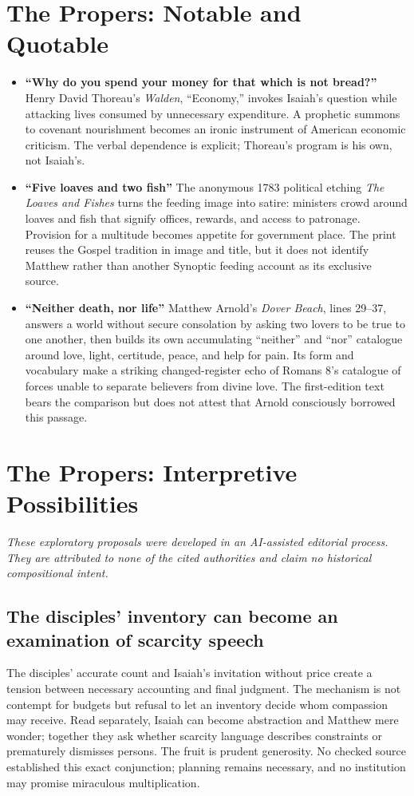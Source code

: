 \section*{The Propers: Notable and Quotable}
{\small
\begin{itemize}
\item \textbf{“Why do you spend your money for that which is not bread?”\enspace{}} Henry David Thoreau's \emph{Walden}, “Economy,” invokes Isaiah's question while attacking lives consumed by unnecessary expenditure. A prophetic summons to covenant nourishment becomes an ironic instrument of American economic criticism. The verbal dependence is explicit; Thoreau's program is his own, not Isaiah's.
\item \textbf{“Five loaves and two fish”\enspace{}} The anonymous 1783 political etching \emph{The Loaves and Fishes} turns the feeding image into satire: ministers crowd around loaves and fish that signify offices, rewards, and access to patronage. Provision for a multitude becomes appetite for government place. The print reuses the Gospel tradition in image and title, but it does not identify Matthew rather than another Synoptic feeding account as its exclusive source.
\item \textbf{“Neither death, nor life”\enspace{}} Matthew Arnold's \emph{Dover Beach}, lines 29--37, answers a world without secure consolation by asking two lovers to be true to one another, then builds its own accumulating “neither” and “nor” catalogue around love, light, certitude, peace, and help for pain. Its form and vocabulary make a striking changed-register echo of Romans 8's catalogue of forces unable to separate believers from divine love. The first-edition text bears the comparison but does not attest that Arnold consciously borrowed this passage.
\end{itemize}}

\section*{The Propers: Interpretive Possibilities}
\noindent\emph{These exploratory proposals were developed in an AI-assisted editorial process. They are attributed to none of the cited authorities and claim no historical compositional intent.}

\subsection*{The disciples' inventory can become an examination of scarcity speech\enspace{}}
The disciples' accurate count and Isaiah's invitation without price create a tension between necessary accounting and final judgment. The mechanism is not contempt for budgets but refusal to let an inventory decide whom compassion may receive. Read separately, Isaiah can become abstraction and Matthew mere wonder; together they ask whether scarcity language describes constraints or prematurely dismisses persons. The fruit is prudent generosity. No checked source established this exact conjunction; planning remains necessary, and no institution may promise miraculous multiplication.

